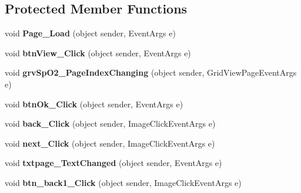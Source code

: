\subsection*{Protected Member Functions}
\begin{DoxyCompactItemize}
\item 
\hypertarget{classusertrackmyhealth__spo2_a756d6e0874de240d7c23d48cd740b6f0}{void {\bfseries Page\-\_\-\-Load} (object sender, Event\-Args e)}\label{classusertrackmyhealth__spo2_a756d6e0874de240d7c23d48cd740b6f0}

\item 
\hypertarget{classusertrackmyhealth__spo2_a346dd91301827b862e04c739933cab65}{void {\bfseries btn\-View\-\_\-\-Click} (object sender, Event\-Args e)}\label{classusertrackmyhealth__spo2_a346dd91301827b862e04c739933cab65}

\item 
\hypertarget{classusertrackmyhealth__spo2_a74a66c2b33b24c8d4bd40f1854e10d25}{void {\bfseries grv\-Sp\-O2\-\_\-\-Page\-Index\-Changing} (object sender, Grid\-View\-Page\-Event\-Args e)}\label{classusertrackmyhealth__spo2_a74a66c2b33b24c8d4bd40f1854e10d25}

\item 
\hypertarget{classusertrackmyhealth__spo2_ac408408ac6402360304be33577de40dd}{void {\bfseries btn\-Ok\-\_\-\-Click} (object sender, Event\-Args e)}\label{classusertrackmyhealth__spo2_ac408408ac6402360304be33577de40dd}

\item 
\hypertarget{classusertrackmyhealth__spo2_a4fc5b56564d7891a33cec7e7073e7c53}{void {\bfseries back\-\_\-\-Click} (object sender, Image\-Click\-Event\-Args e)}\label{classusertrackmyhealth__spo2_a4fc5b56564d7891a33cec7e7073e7c53}

\item 
\hypertarget{classusertrackmyhealth__spo2_a7b318bf906106e06693d2ff331994a1c}{void {\bfseries next\-\_\-\-Click} (object sender, Image\-Click\-Event\-Args e)}\label{classusertrackmyhealth__spo2_a7b318bf906106e06693d2ff331994a1c}

\item 
\hypertarget{classusertrackmyhealth__spo2_a63eddfeeff8c18718e7b8041c01bed36}{void {\bfseries txtpage\-\_\-\-Text\-Changed} (object sender, Event\-Args e)}\label{classusertrackmyhealth__spo2_a63eddfeeff8c18718e7b8041c01bed36}

\item 
\hypertarget{classusertrackmyhealth__spo2_ad3a61fd335ab81a961437f443b5ad2f7}{void {\bfseries btn\-\_\-back1\-\_\-\-Click} (object sender, Image\-Click\-Event\-Args e)}\label{classusertrackmyhealth__spo2_ad3a61fd335ab81a961437f443b5ad2f7}


\end{DoxyCompactItemize}

